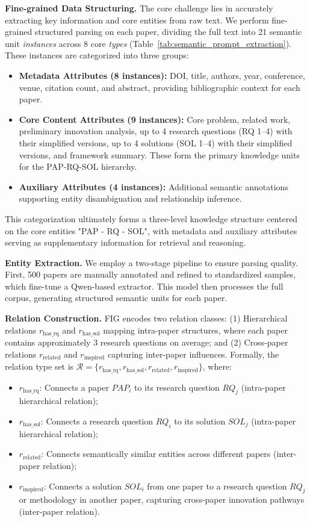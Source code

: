 \documentclass[runningheads]{llncs}
\begin{document}
\textbf{Fine-grained Data Structuring.} The core challenge lies in accurately extracting key information and core entities from raw text. We perform fine-grained structured parsing on each paper, dividing the full text into 21 semantic unit \textit{instances} across 8 core \textit{types} (Table~\ref{tab:semantic_prompt_extraction}). These instances are categorized into three groups:
\begin{itemize}[leftmargin=*]
    \item \textbf{Metadata Attributes (8 instances):} DOI, title, authors, year, conference, venue, citation count, and abstract, providing bibliographic context for each paper.
    \item \textbf{Core Content Attributes (9 instances):} Core problem, related work, preliminary innovation analysis, up to 4 research questions (RQ 1--4) with their simplified versions, up to 4 solutions (SOL 1--4) with their simplified versions, and framework summary. These form the primary knowledge units for the PAP-RQ-SOL hierarchy.
    \item \textbf{Auxiliary Attributes (4 instances):} Additional semantic annotations supporting entity disambiguation and relationship inference.
\end{itemize}
This categorization ultimately forms a three-level knowledge structure centered on the core entities "PAP - RQ - SOL", with metadata and auxiliary attributes serving as supplementary information for retrieval and reasoning.

\textbf{Entity Extraction.} We employ a two-stage pipeline to ensure parsing quality. First, 500 papers are manually annotated and refined to standardized samples, which fine-tune a Qwen-based extractor. This model then processes the full corpus, generating structured semantic units for each paper.

\textbf{Relation Construction.} FIG encodes two relation classes: (1) Hierarchical relations $r_{\text{has\_rq}}$ and $r_{\text{has\_sol}}$ mapping intra-paper structures, where each paper contains approximately 3 research questions on average; and (2) Cross-paper relations $r_{\text{related}}$ and $r_{\text{inspired}}$ capturing inter-paper influences. Formally, the relation type set is $\mathcal{R} = \{r_{\text{has\_rq}}, r_{\text{has\_sol}}, r_{\text{related}}, r_{\text{inspired}}\}$, where:
\begin{itemize}[leftmargin=*]
    \item $r_{\text{has\_rq}}$: Connects a paper $PAP_i$ to its research question $RQ_j$ (intra-paper hierarchical relation);
    \item $r_{\text{has\_sol}}$: Connects a research question $RQ_i$ to its solution $SOL_j$ (intra-paper hierarchical relation);
    \item $r_{\text{related}}$: Connects semantically similar entities across different papers (inter-paper relation);
    \item $r_{\text{inspired}}$: Connects a solution $SOL_i$ from one paper to a research question $RQ_j$ or methodology in another paper, capturing cross-paper innovation pathways (inter-paper relation).
\end{itemize}
\end{document}
